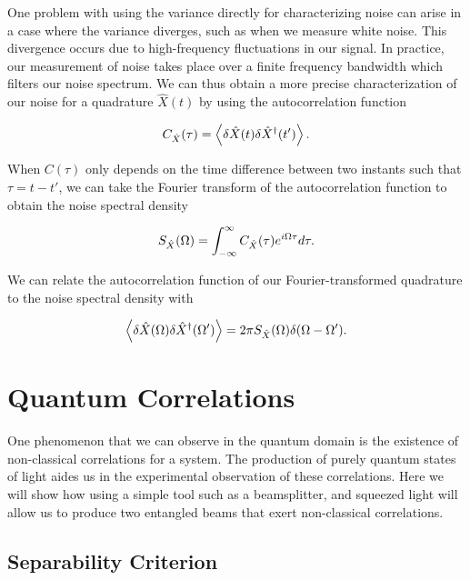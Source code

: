One problem with using the variance directly for characterizing noise can arise in a case where the variance diverges, such as when we measure white noise.  This divergence occurs due to high-frequency fluctuations in our signal.  In practice, our measurement of noise takes place over a finite frequency bandwidth which filters our noise spectrum.  We can thus obtain a more precise characterization of our noise for a quadrature $\hat{X}(t)$ by using the autocorrelation function \cite{courty05}

\begin{equation}
  \label{eq:autocorelation}
  C_{\hat{X}}(\tau) = \left<  \delta \hat{X}(t) \delta \hat{X}^\dagger(t') \right>.
\end{equation}

\noindent
When $C(\tau)$ only depends on the time difference between two instants such that $\tau=t-t'$, we can take the Fourier transform of the autocorrelation function to obtain the noise spectral density

\begin{equation}
  \label{eq:noise_spectral_density}
  S_{\hat{X}}(\Omega ) = \int^\infty_{-\infty} C_{\hat{X}}(\tau) e^{i \Omega \tau}  d\tau.
\end{equation}

\noindent
We can relate the autocorrelation function of our Fourier-transformed quadrature to the noise spectral density with 

\begin{equation}
  \label{eq:noise_spectral_fourier}
  \left<  \delta \hat{X}(\Omega ) \delta \hat{X}^\dagger(\Omega') \right> = 2 \pi S_{\hat{X}}(\Omega ) \delta(\Omega - \Omega' ).
\end{equation}


\section{Quantum Correlations}
\label{quantum_correlations} 


One phenomenon that we can observe in the quantum domain is the existence of non-classical correlations for a system.  The production of purely quantum states of light aides us in the experimental observation of these correlations.  Here we will show how using a simple tool such as a beamsplitter, and squeezed light will allow us to produce two entangled beams that exert non-classical correlations.

\subsection{Separability Criterion} 
\label{separability_criterion} 

